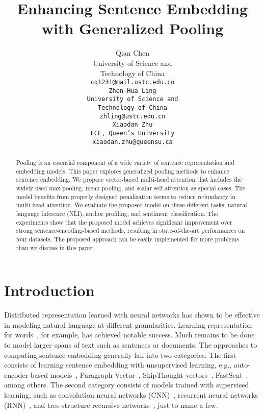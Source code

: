 \documentclass[11pt]{article}
\title{Enhancing Sentence Embedding with Generalized Pooling}
\author{
Qian Chen \\
University of Science and \\ 
Technology of China\\
\tt{cq1231@mail.ustc.edu.cn} \\\And
Zhen-Hua Ling \\
University of Science and \\
Technology of China\\
\tt{zhling@ustc.edu.cn} \\\AND
Xiaodan Zhu \\
ECE, Queen's University \\
\texttt{xiaodan.zhu@queensu.ca} \\
}
\date{}
\begin{document}
\maketitle
\begin{abstract}
Pooling is an essential component of a wide variety of sentence representation and embedding models. This paper explores generalized pooling methods to enhance sentence embedding. We propose vector-based multi-head attention that includes the widely used max pooling, mean pooling, and scalar self-attention as special cases. The model benefits from properly designed penalization terms to reduce redundancy in multi-head attention. We evaluate the proposed model on three different tasks: natural language inference (NLI), author profiling, and sentiment classification. The experiments show that the proposed model achieves significant improvement over strong sentence-encoding-based methods, resulting in state-of-the-art performances on four datasets. The proposed approach can be easily implemented for more problems than we discuss in this paper.

\end{abstract}

\section{Introduction}

Distributed representation learned with neural networks has shown to be effective in modeling natural language at different granularities. Learning representation for words~\cite{DBLP:conf/nips/BengioDV00,DBLP:journals/corr/abs-1301-3781,DBLP:conf/emnlp/PenningtonSM14}, for example, has achieved notable success. Much remains to be done to model larger spans of text such as sentences or documents. 
The approaches to computing sentence embedding generally fall into two categories. The first consists of learning sentence embedding with unsupervised learning, e.g., auto-encoder-based models~\cite{DBLP:conf/emnlp/SocherPHNM11}, Paragraph Vector~\cite{DBLP:conf/icml/LeM14}, SkipThought vectors~\cite{DBLP:conf/nips/KirosZSZUTF15}, FastSent~\cite{DBLP:conf/naacl/HillCK16}, among others. 
The second category consists of models trained with supervised learning, such as convolution neural networks (CNN)~\cite{DBLP:conf/emnlp/Kim14,DBLP:conf/acl/KalchbrennerGB14}, recurrent neural networks (RNN)~\cite{DBLP:conf/emnlp/ConneauKSBB17,DBLP:conf/emnlp/BowmanAPM15}, and tree-structure recursive networks~\cite{D13-1170,DBLP:conf/icml/ZhuSG15,DBLP:conf/acl/TaiSM15}, just to name a few. 
\end{document}
